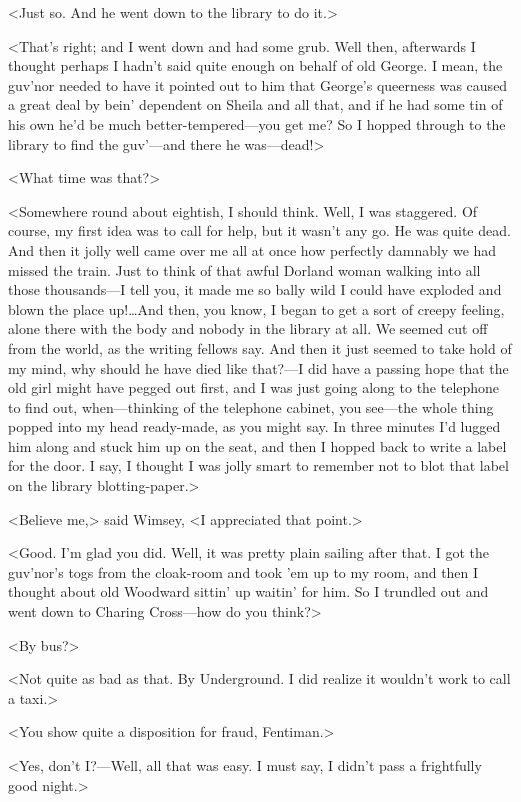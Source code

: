 <Just so. And he went down to the library to do it.>

<That's right; and I went down and had some grub. Well then, afterwards I thought perhaps I hadn't said quite enough on behalf of old George. I mean, the guv'nor needed to have it pointed out to him that George's queerness was caused a great deal by bein' dependent on Sheila and all that, and if he had some tin of his own he'd be much better-tempered—you get me? So I hopped through to the library to find the guv'—and there he was—dead!>

<What time was that?>

<Somewhere round about eightish, I should think. Well, I was staggered. Of course, my first idea was to call for help, but it wasn't any go. He was quite dead. And then it jolly well came over me all at once how perfectly damnably we had missed the train. Just to think of that awful Dorland woman walking into all those thousands—I tell you, it made me so bally wild I could have exploded and blown the place up!\dots And then, you know, I began to get a sort of creepy feeling, alone there with the body and nobody in the library at all. We seemed cut off from the world, as the writing fellows say. And then it just seemed to take hold of my mind, why should he have died like that?—I did have a passing hope that the old girl might have pegged out first, and I was just going along to the telephone to find out, when—thinking of the telephone cabinet, you see—the whole thing popped into my head ready-made, as you might say. In three minutes I'd lugged him along and stuck him up on the seat, and then I hopped back to write a label for the door. I say, I thought I was jolly smart to remember not to blot that label on the library blotting-paper.>

<Believe me,> said Wimsey, <I appreciated that point.>

<Good. I'm glad you did. Well, it was pretty plain sailing after that. I got the guv'nor's togs from the cloak-room and took 'em up to my room, and then I thought about old Woodward sittin' up waitin' for him. So I trundled out and went down to Charing Cross—how do you think?>

<By bus?>

<Not quite as bad as that. By Underground. I did realize it wouldn't work to call a taxi.>

<You show quite a disposition for fraud, Fentiman.>

<Yes, don't I\@?—Well, all that was easy. I must say, I didn't pass a frightfully good night.>

